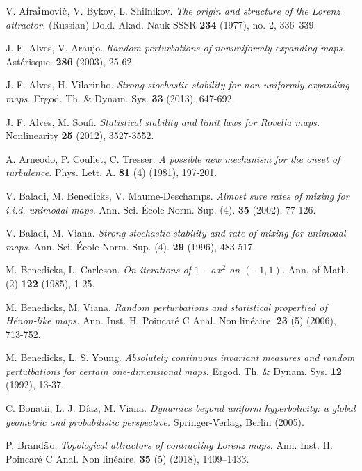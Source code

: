 \documentclass[11pt,oneside]{article}
\theoremstyle{plain}
\numberwithin{equation}{section}
\numberwithin{figure}{section}
\numberwithin{table}{section}
\begin{document}
\begin{thebibliography}{}

V. Afra$\rm{\breve{i}}$movi$\rm{\check{c}}$, V. Bykov, L. Shilnikov. {\it The origin and structure of the Lorenz attractor.} (Russian) Dokl. Akad. Nauk SSSR {\bf 234} (1977), no. 2, 336–339.



J. F. Alves, V. Araujo. {\it Random perturbations of nonuniformly expanding maps.} Ast\'erisque. {\bf 286} (2003), 25-62.

J. F. Alves, H. Vilarinho. {\it Strong stochastic stability for non-uniformly expanding maps.} Ergod. Th. \& Dynam. Sys. {\bf 33} (2013), 647-692.


J. F. Alves, M. Soufi. {\it Statistical stability and limit laws for Rovella maps.} Nonlinearity {\bf 25} (2012), 3527-3552.

A. Arneodo, P. Coullet, C. Tresser. {\it A possible new mechanism for the onset of turbulence.} Phys. Lett. A. {\bf 81} (4) (1981), 197-201.

V. Baladi, M. Benedicks, V. Maume-Deschamps. {\it Almost sure rates of mixing for i.i.d. unimodal maps.} Ann. Sci. \'Ecole Norm. Sup. (4). {\bf 35} (2002), 77-126.

V. Baladi, M. Viana. {\it Strong stochastic stability and rate of mixing for unimodal maps.} Ann. Sci. \'Ecole Norm. Sup. (4). {\bf 29} (1996), 483-517.

M. Benedicks, L. Carleson. {\it On iterations of $1 - ax^2$ on $(-1, 1)$.} Ann. of Math. (2) {\bf 122} (1985), 1-25.


M. Benedicks, M. Viana. {\it Random perturbations and statistical propertied of H\'enon-like maps.} Ann. Inst. H. Poincar\'e C Anal. Non lin\'eaire. {\bf 23} (5) (2006), 713-752.

M. Benedicks, L. S. Young. {\it Absolutely continuous invariant measures and random pertutbations for certain one-dimensional maps.} Ergod. Th. \& Dynam. Sys. {\bf 12} (1992), 13-37.


C. Bonatii, L. J. D\'iaz, M. Viana. {\it Dynamics beyond uniform hyperbolicity: a global geometric and probabilistic perspective.} Springer-Verlag, Berlin (2005).

P. Brand{$\tilde {\rm a}$}o. {\it Topological attractors of contracting Lorenz maps.} Ann. Inst. H. Poincar\'e C Anal. Non lin\'eaire. {\bf 35} (5) (2018), 1409–1433.



\end{thebibliography}
\end{document}
